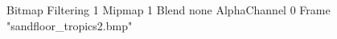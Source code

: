 {Bitmap
	{Filtering 1}
	{Mipmap 1}
	{Blend none}
	{AlphaChannel 0}
	{Frame "sandfloor_tropics2.bmp"}
}
